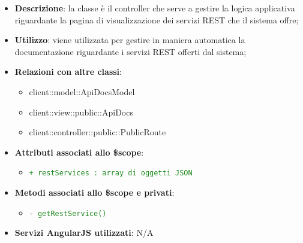 		\begin{itemize}
			\item \textbf{Descrizione}: la classe è il controller che serve a gestire la logica applicativa riguardante la pagina di visualizzazione dei servizi REST che il sistema offre;
			\item \textbf{Utilizzo}: viene utilizzata per gestire in maniera automatica la documentazione riguardante i servizi REST offerti dal sistema;
			\item \textbf{Relazioni con altre classi}:
				\begin{itemize}
					\item client::model::ApiDocsModel
					\item client::view::public::ApiDocs
					\item client::controller::public::PublicRoute
				\end{itemize}

			\item \textbf{Attributi associati allo \$scope}:
				\begin{itemize}
					\item \textcolor{forestgreen}{\texttt{+ restServices : array di oggetti JSON }}
				\end{itemize}

			\item \textbf{Metodi associati allo \$scope e privati}:
				\begin{itemize}
					\item \textcolor{forestgreen}{\texttt{- getRestService()}}
				\end{itemize}

			\item \textbf{Servizi AngularJS utilizzati}: N/A

		\end{itemize}


